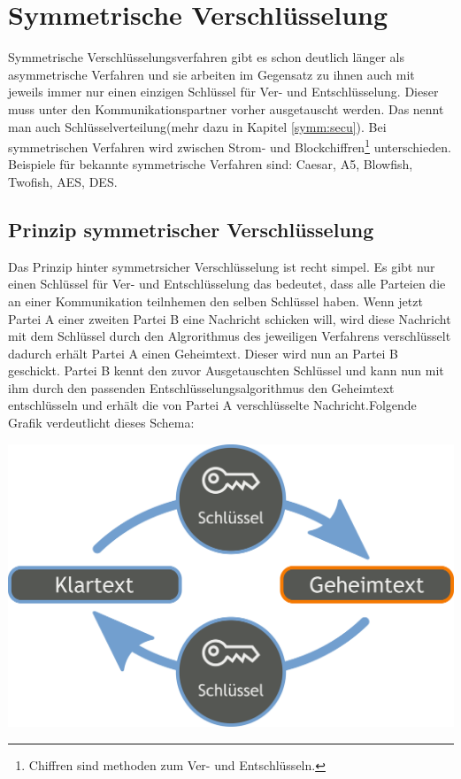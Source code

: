 \documentclass[a4paper,12pt,titlepage]{article}
\begin{document}
\section{Symmetrische Verschlüsselung}\label{symm}
Symmetrische Verschlüsselungsverfahren gibt es schon deutlich länger als asymmetrische Verfahren und sie arbeiten im Gegensatz zu ihnen auch mit jeweils immer nur einen einzigen Schlüssel für Ver- und Entschlüsselung. Dieser muss unter den Kommunikationspartner vorher ausgetauscht werden. Das nennt man auch Schlüsselverteilung(mehr dazu in Kapitel \ref{symm:secu}). \newline Bei symmetrischen Verfahren wird zwischen Strom- und Blockchiffren\footnote{Chiffren sind methoden zum Ver- und Entschlüsseln.} unterschieden. Beispiele für bekannte symmetrische Verfahren sind: Caesar, A5, Blowfish, Twofish, AES, DES. %

\subsection{Prinzip symmetrischer Verschlüsselung}
Das Prinzip hinter symmetrsicher Verschlüsselung ist recht simpel. Es gibt nur einen Schlüssel für Ver- und Entschlüsselung das bedeutet, dass alle Parteien die an einer Kommunikation teilnhemen den selben Schlüssel haben. Wenn jetzt Partei A einer zweiten Partei B eine Nachricht schicken will, wird diese Nachricht mit dem Schlüssel durch den Algrorithmus des jeweiligen Verfahrens verschlüsselt dadurch erhält Partei A einen Geheimtext. Dieser wird nun an Partei B geschickt. Partei B kennt den zuvor Ausgetauschten Schlüssel und kann nun mit ihm durch den passenden Entschlüsselungsalgorithmus den Geheimtext entschlüsseln und erhält die von Partei A verschlüsselte Nachricht.\newline Folgende Grafik verdeutlicht dieses Schema:

\begin{center}
\includegraphics[scale=0.2]{symm_shema.png} %
\end{center}
\end{document}
